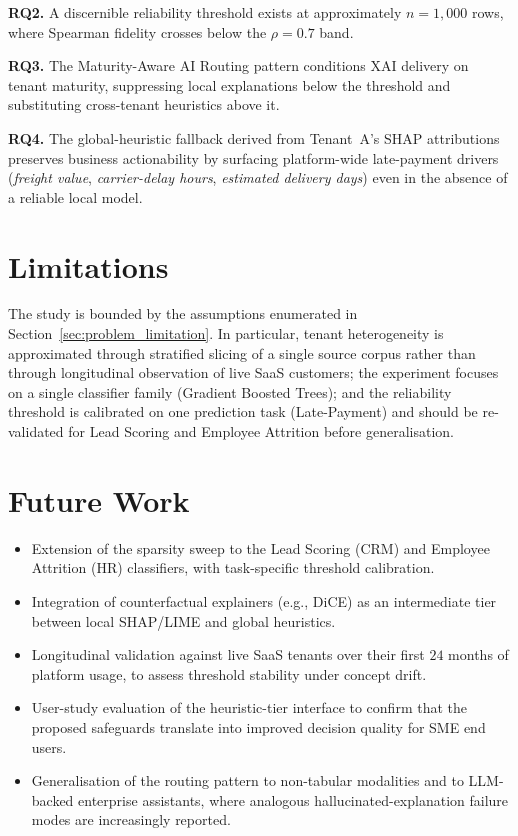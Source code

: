 \textbf{RQ2.} A discernible reliability threshold exists at approximately $n = 1{,}000$ rows, where Spearman fidelity crosses below the $\rho = 0.7$ band.

\textbf{RQ3.} The Maturity-Aware AI Routing pattern conditions XAI delivery on tenant maturity, suppressing local explanations below the threshold and substituting cross-tenant heuristics above it.

\textbf{RQ4.} The global-heuristic fallback derived from Tenant~A's SHAP attributions preserves business actionability by surfacing platform-wide late-payment drivers (\emph{freight value}, \emph{carrier-delay hours}, \emph{estimated delivery days}) even in the absence of a reliable local model.

\section{Limitations}
\label{sec:conclusion_limitations}

The study is bounded by the assumptions enumerated in Section~\ref{sec:problem_limitation}. In particular, tenant heterogeneity is approximated through stratified slicing of a single source corpus rather than through longitudinal observation of live SaaS customers; the experiment focuses on a single classifier family (Gradient Boosted Trees); and the reliability threshold is calibrated on one prediction task (Late-Payment) and should be re-validated for Lead Scoring and Employee Attrition before generalisation.

\section{Future Work}
\label{sec:conclusion_future}

\begin{itemize}
  \item Extension of the sparsity sweep to the Lead Scoring (CRM) and Employee Attrition (HR) classifiers, with task-specific threshold calibration.
  \item Integration of counterfactual explainers (e.g., DiCE) as an intermediate tier between local SHAP/LIME and global heuristics.
  \item Longitudinal validation against live SaaS tenants over their first $24$ months of platform usage, to assess threshold stability under concept drift.
  \item User-study evaluation of the heuristic-tier interface to confirm that the proposed safeguards translate into improved decision quality for SME end users.
  \item Generalisation of the routing pattern to non-tabular modalities and to LLM-backed enterprise assistants, where analogous hallucinated-explanation failure modes are increasingly reported.
\end{itemize}
